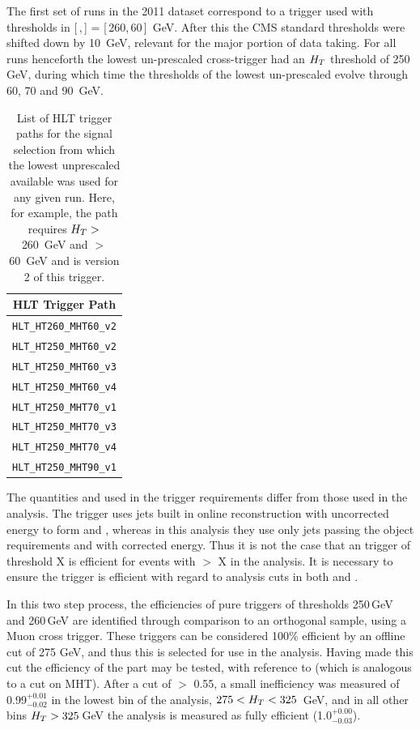 The first set of runs in the 2011 dataset correspond to a trigger used with thresholds in [\,\HT,\,\MHT] = [\,260,\,60\,]~GeV. After this the CMS standard thresholds were shifted down by 10~GeV, relevant for the major portion of data taking. For all runs henceforth the lowest un-prescaled cross-trigger had an $H_{T}$ threshold of 250 GeV, during which time the \MHT thresholds of the lowest un-prescaled evolve through 60, 70 and 90~GeV.





\begin{table}[htbp]
\centering
\begin{tabular}{c}
\hline
\hline
HLT Trigger Path\\
\hline
\hline
\verb!HLT_HT260_MHT60_v2!\\
\verb!HLT_HT250_MHT60_v2!\\
\verb!HLT_HT250_MHT60_v3!\\
\verb!HLT_HT250_MHT60_v4!\\
\verb!HLT_HT250_MHT70_v1!\\
\verb!HLT_HT250_MHT70_v3!\\
\verb!HLT_HT250_MHT70_v4!\\
\verb!HLT_HT250_MHT90_v1!\\
\hline
\end{tabular}
\caption{\label{tab:sigtrig} List of HLT trigger paths for the signal selection from which the lowest unprescaled available was used for any given run. Here, for example, the path  requires $H_{T} >$ 260~GeV and \MHT $>$ 60~GeV and is version 2 of this trigger.}
\end{table}

The quantities \HT and \MHT used in the trigger requirements differ from those used in the analysis. The trigger uses jets built in online reconstruction with uncorrected energy to form \HT and \MHT, whereas in this analysis they use only jets passing the object requirements and with corrected energy. Thus it is not the case that an \HT trigger of threshold X is efficient for events with \HT $>$ X in the analysis. It is necessary to ensure the trigger is efficient with regard to analysis cuts in both \HT and \MHT.

In this two step process, the efficiencies of pure \HT triggers of thresholds 250\,GeV and 260\,GeV are identified through comparison to an orthogonal sample, using a Muon \HT cross trigger. These triggers can be considered 100\% efficient by an offline \HT cut of 275 GeV, and thus this is selected for use in the analysis. Having made this cut the efficiency of the \MHT part may be tested, with reference to \alt (which is analogous to a cut on MHT). After a cut of \alt $>$ 0.55, a small inefficiency was measured of 0.99$^{+0.01}_{-0.02}$ in the lowest bin of the analysis, $275 < H_{T} < 325$~GeV, and in all other bins $H_{T} > 325$\,GeV the analysis is measured as fully efficient (1.0$^{+0.00}_{-0.03}$).

